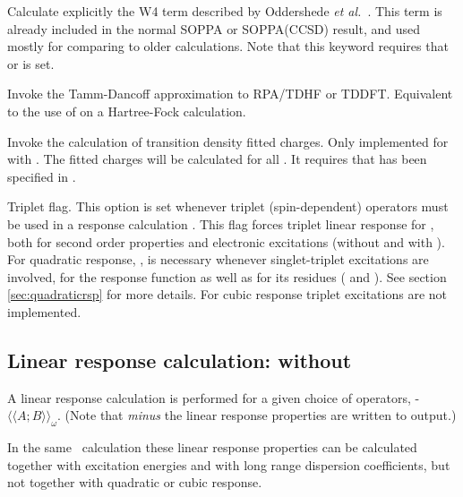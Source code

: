 \begin{description}
\item{}
Calculate explicitly the W4 term described by Oddershede {\it et
al.\/}~\cite{jopjdycpr2}. This term is already included in the normal
SOPPA or
SOPPA(CCSD) result, and used mostly for comparing to older
calculations. Note that this keyword requires that  or
is set.

\item{}
Invoke the Tamm-Dancoff approximation to RPA/TDHF or TDDFT. Equivalent to the
use of  on a Hartree-Fock calculation.

\item{}
Invoke the calculation of transition density fitted charges. Only implemented for
 with . The fitted charges will be calculated for
all . It requires that  has been specified in
.

\item{}
Triplet flag. This option is set whenever triplet
(spin-dependent)
operators must be used in a response calculation
\cite{jodlypjjcp91,ovhapjhjajthjojcp97}.
This flag forces triplet linear response for ,
both for second order properties and electronic excitations
(without and with ).
For quadratic response, ,  is necessary
whenever singlet-triplet excitations are involved, for the response function as well as  for
its residues ( and ).
See section \ref{sec:quadraticrsp} for more details.
For cubic response triplet excitations are not implemented.

\end{description}

\subsection{Linear response calculation:  without }
\label{sec:linearrsp}

A linear response
\cite{jodlypjjcp91,pjhjajjojcp89} calculation is performed for a given
choice of operators,
-$\langle\!\langle A; B \rangle\!\rangle_{\omega}$.
(Note that {\em minus} the linear response properties are written to output.)

In the same \resp\ calculation these linear response properties can be calculated
together with excitation energies
and with long range dispersion coefficients, but not
together with quadratic or cubic response.

